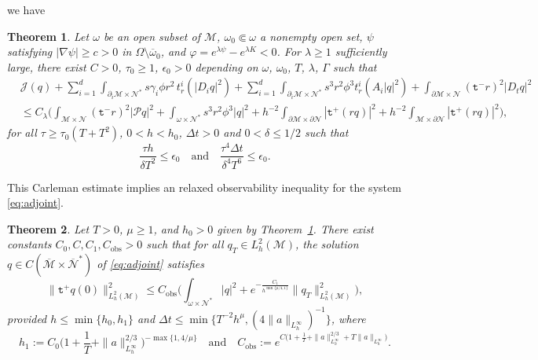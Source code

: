 \documentclass[11pt,oneside,leqno]{amsart}
\numberwithin{equation}{section}
\numberwithin{equation}{section}
\newtheorem{theorem}{Theorem}[section]
\newcommand{\trp}{\mathtt t^+}
\newcommand{\trm}{\mathtt t^-}
\begin{document}
we have
\begin{theorem}\label{thm:Carleman:q}
Let $\omega$ be an open subset of $\mathcal{M}$, $\omega_{0}\Subset \omega$ a nonempty open set, $\psi$ satisfying $|\nabla\psi|\geq c>0$ in $\Omega\setminus \overline{\omega}_{0}$, and $\varphi=e^{\lambda\psi}-e^{\lambda K}<0$. For $\lambda\geq 1$ sufficiently large, there exist $C>0$, $\tau_{0}\geq 1$, $\epsilon_{0}>0$ depending on $\omega$, $\omega_{0}$, $T$, $\lambda$, $\Gamma$ such that
\begin{equation}\label{eq:Carleman:q}
\begin{aligned}
&\mathcal{J}(q)+\sum_{i=1}^{d}\int_{\partial_{i}\mathcal{M}\times\mathcal{N}^{\ast}}s\gamma_{i}\phi r^{2}\,t_{r}^{i}(|D_{i}q|^{2})+\sum_{i=1}^{d}\int_{\partial_{i}\mathcal{M}\times\mathcal{N}^{\ast}}s^{3}r^{2}\phi^{3}t_{r}^{i}(A_{i}|q|^{2})+\int_{\partial\mathcal{M}\times\mathcal{N}}(\trm r)^{2}|D_{t}q|^{2}\\
&\leq C_{\lambda}\bigg(\int_{\mathcal{M}\times\mathcal{N}}(\trm r)^{2}|\mathcal{P}q|^{2}+\int_{\omega\times\mathcal{N}^{\ast}}s^{3}r^{2}\phi^{3}|q|^{2}+h^{-2}\int_{\partial\mathcal{M}\times\partial\mathcal{N}}|\trp(rq)|^{2}+h^{-2}\int_{\mathcal{M}\times\partial\mathcal{N}}|\trp(rq)|^{2}\bigg),
\end{aligned}
\end{equation}
for all $\tau\geq\tau_{0}(T+T^{2})$, $0<h<h_{0}$, $\Delta t>0$ and $0<\delta\leq 1/2$ such that
\begin{equation}\label{eq:CFL:conditions}
\frac{\tau h}{\delta T^{2}}\leq\epsilon_{0}\quad\text{and}\quad\frac{\tau^{4}\Delta t}{\delta^{4}T^{6}}\leq\epsilon_{0}.
\end{equation}
\end{theorem}
This Carleman estimate implies an relaxed observability inequality for the system \eqref{eq:adjoint}.
\begin{theorem}\label{thm:observability}
Let $T>0$, $\mu\geq 1$, and $h_{0}>0$ given by Theorem~\ref{thm:Carleman:q}. There exist constants $C_{0},C,C_{1},C_{\mathrm{obs}}>0$ such that for all $ q_{T}\in L^{2}_{h}(\mathcal{M})$, the solution $q\in C(\overline{\mathcal{M}}\times\overline{\mathcal{N}}^{\ast})$ of \eqref{eq:adjoint} satisfies
\begin{equation}\label{eq:observability}
\|\trp q(0)\|^{2}_{L^{2}_{h}(\mathcal{M})}\leq C_{\mathrm{obs}}\bigg(\int_{\omega\times\mathcal{N}^{\ast}}|q|^{2}+e^{-\frac{C_{1}}{h^{\min\{\mu/4,1\}}}}\|q_{T}\|^{2}_{L^{2}_{h}(\mathcal{M})}\bigg),
\end{equation}
provided $h\leq\min\{h_{0},h_{1}\}$ and $\Delta t\leq\min\{T^{-2}h^{\mu},(4\|a\|_{L^{\infty}_{h}})^{-1}\}$, where
\begin{equation*}
h_{1}:=C_{0}\bigg(1+\frac{1}{T}+\|a\|_{L^{\infty}_{h}}^{2/3}\bigg)^{-\max\{1,4/\mu\}}\quad\text{and}\quad C_{\mathrm{obs}}:=e^{C\big(1+\frac{1}{T}+\|a\|_{L^{\infty}_{h}}^{2/3}+T\|a\|_{L^{\infty}_{h}}\big)}.
\end{equation*}
\end{theorem}
\end{document}
